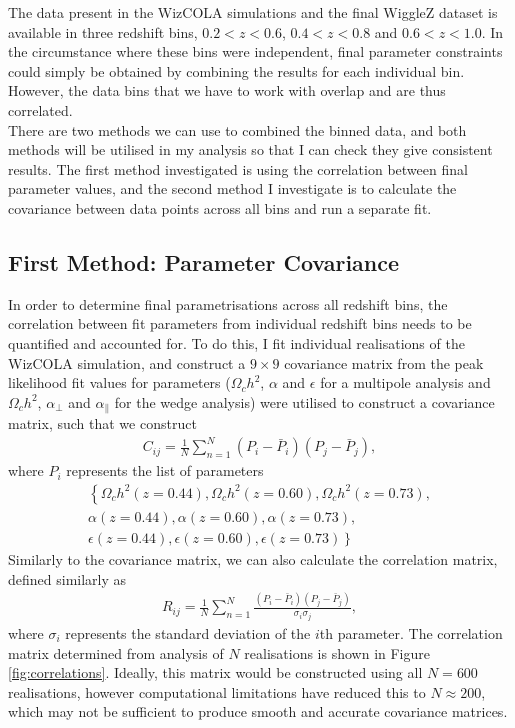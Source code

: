 \documentclass[titlesmallcaps, examinerscopy, copyrightpage]{uqthesis}
\begin{document}
The data present in the WizCOLA simulations and the final WiggleZ dataset is available in three redshift bins, $0.2 < z < 0.6$, $0.4 < z < 0.8$ and $0.6 < z < 1.0$. In the circumstance where these bins were independent, final parameter constraints could simply be obtained by combining the results for each individual bin. However, the data bins that we have to work with overlap and are thus correlated. \\

There are two methods we can use to combined the binned data, and both methods will be utilised in my analysis so that I can check they give consistent results. The first method investigated is using the correlation between final parameter values, and the second method I investigate is to calculate the covariance between data points across all bins and run a separate fit.

\subsection{First Method: Parameter Covariance} \label{sec:parameterCov}

In order to determine final parametrisations across all redshift bins, the correlation between fit parameters from individual redshift bins needs to be quantified and accounted for. To do this, I fit individual realisations of the WizCOLA simulation, and construct a $9\times 9$ covariance matrix from the peak likelihood fit values for parameters ($\Omega_c h^2$, $\alpha$ and $\epsilon$ for a multipole analysis and $\Omega_c h^2$, $\alpha_\perp$ and $\alpha_\parallel$ for the wedge analysis) were utilised to construct a covariance matrix, such that we construct
\begin{align}
C_{ij} = \frac{1}{N} \sum\limits_{n=1}^{N} (P_i - \bar{P}_i)(P_j - \bar{P}_j),
\end{align}
where $P_i$ represents the list of parameters 
\begin{align*}
\left\lbrace \Omega_c h^2 (z = 0.44), \Omega_c h^2 (z = 0.60),  \Omega_c h^2 (z = 0.73), \right. \\ 
\alpha (z = 0.44), \alpha (z = 0.60),  \alpha (z = 0.73), \\
\epsilon (z = 0.44), \left. \epsilon (z = 0.60),  \epsilon (z = 0.73) \right\rbrace
\end{align*}
Similarly to the covariance matrix, we can also calculate the correlation matrix, defined similarly as
\begin{align}
R_{ij} = \frac{1}{N} \sum\limits_{n=1}^{N} \frac{(P_i - \bar{P}_i)(P_j - \bar{P}_j)}{\sigma_i \sigma_j},
\end{align}
where $\sigma_i$ represents the standard deviation of the $i$th parameter. The correlation matrix determined from analysis of $N$ realisations is shown in Figure \ref{fig:correlations}. Ideally, this matrix would be constructed using all $N=600$ realisations, however computational limitations have reduced this to $N \approx 200$, which may not be sufficient to produce smooth and accurate covariance matrices.
\end{document}
